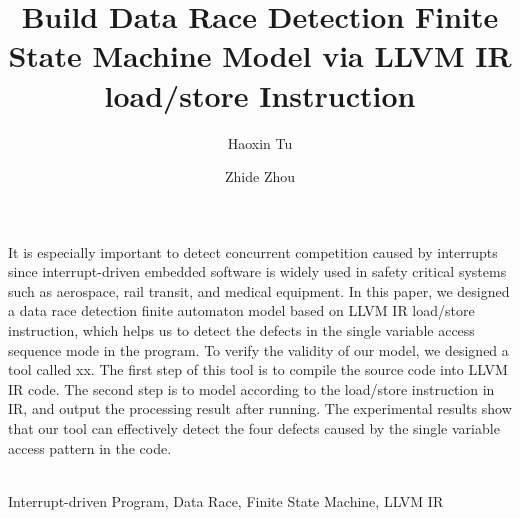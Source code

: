 \documentclass[acmsmall]{acmart}
\begin{document}
\title{Build Data Race Detection Finite State Machine Model via LLVM IR load/store Instruction }

\author{Haoxin Tu}
\author{Zhide Zhou}









\maketitle



It is especially important to detect concurrent competition caused by interrupts since interrupt-driven embedded software is widely used in safety critical systems such as aerospace, rail transit, and medical equipment. In this paper, we designed a data race detection finite automaton model based on LLVM IR load/store instruction, which helps us to detect the defects in the single variable access sequence mode in the program.
To verify the validity of our model, we designed a tool called xx. The first step of this tool is to compile the source code into LLVM IR code. The second step is to model according to the load/store instruction in IR, and output the processing result after running.
The experimental results show that our tool can effectively detect the four defects caused by the single variable access pattern in the code.

~\\


 Interrupt-driven Program, Data Race, Finite State Machine, LLVM IR













\newpage


\end{document}
